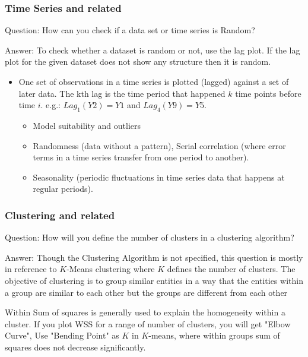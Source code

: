 \documentclass[11pt]{beamer}
\begin{document}
\begin{frame}
\frametitle{Time Series and related}
\begin{block}{Question:}
	How can you check if a data set or time series is Random?
\end{block}
\begin{block}{Answer:}
	To check whether a dataset is random or not, use the lag plot. If the lag plot for the given dataset does not show any structure then it is random.
\end{block}
\begin{itemize}
	\item One set of observations in a time series is plotted (lagged) against a set of later data. The kth lag is the time period that happened $k$ time points before time $i$. e.g.: $Lag_1(Y2) = Y1$ and $Lag_4(Y9) = Y5$.
	\begin{itemize}
		\item Model suitability and outliers
		\item Randomness (data without a pattern), Serial correlation (where error terms in a time series transfer from one period to another).
		\item Seasonality (periodic fluctuations in time series data that happens at regular periods).
	\end{itemize}
\end{itemize}
\end{frame}

\begin{frame}
\frametitle{Clustering and related}
\begin{block}{Question:}
	How will you define the number of clusters in a clustering algorithm?
\end{block}
\begin{block}{Answer:}
	Though the Clustering Algorithm is not specified, this question is mostly in reference to $K$-Means clustering where $K$ defines the number of clusters. The objective of clustering is to group similar entities in a way that the entities within a group are similar to each other but the groups are different from each other
	
	Within Sum of squares is generally used to explain the homogeneity within a cluster. If you plot WSS for a range of number of clusters, you will get "Elbow Curve", Use "Bending Point" as $K$ in $K$-means, where within groups sum of squares does not decrease significantly.
\end{block}
\end{frame}
\end{document}

